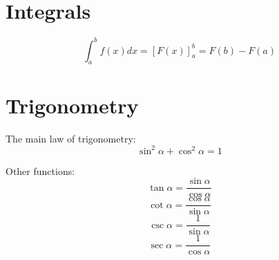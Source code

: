 \documentclass{article}
\begin{document}
\section{Integrals}

\begin{equation}
\int_{a}^{b} f(x) dx = [F(x)]_{a}^{b} = F(b) - F(a)
\end{equation}

\section{Trigonometry}

The main law of trigonometry:
\begin{equation}
\sin^2{\alpha} + \cos^2{\alpha} = 1
\end{equation}

Other functions:
\begin{equation}
\tan{\alpha} = \frac{\sin{\alpha}}{\cos{\alpha}}
\end{equation}
\begin{equation}
\cot{\alpha} = \frac{\cos{\alpha}}{\sin{\alpha}}
\end{equation}
\begin{equation}
\csc{\alpha} = \frac{1}{\sin{\alpha}}
\end{equation}
\begin{equation}
\sec{\alpha} = \frac{1}{\cos{\alpha}}
\end{equation}
\end{document}
